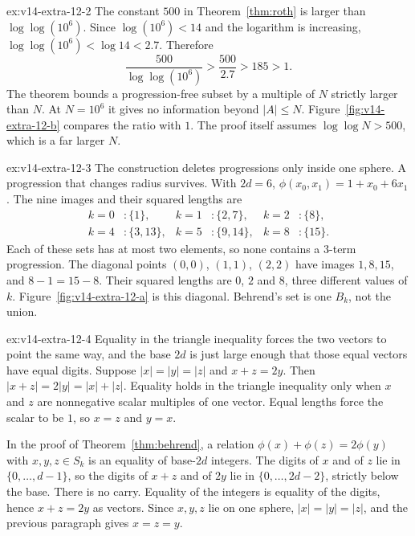 \begin{solution}{ex:v14-extra-12-2}
\idea The constant $500$ in Theorem~\ref{thm:roth} is larger than $\log\log(10^6)$.
\writeup Since $\log(10^6)<14$ and the logarithm is increasing, $\log\log(10^6)<\log14<2.7$. Therefore
\[
\frac{500}{\log\log(10^6)}>\frac{500}{2.7}>185>1.
\]
The theorem bounds a progression-free subset by a multiple of $N$ strictly larger than $N$. At $N=10^6$ it gives no information beyond $|A|\le N$. Figure~\ref{fig:v14-extra-12-b} compares the ratio with $1$. The proof itself assumes $\log\log N>500$, which is a far larger $N$.
\end{solution}

\begin{solution}{ex:v14-extra-12-3}
\idea The construction deletes progressions only inside one sphere. A progression that changes radius survives.
\writeup With $2d=6$, $\phi(x_0,x_1)=1+x_0+6x_1$. The nine images and their squared lengths are
\[
\begin{aligned}
k=0&: \{1\},& k=1&: \{2,7\},& k=2&: \{8\},\\
k=4&: \{3,13\},& k=5&: \{9,14\},& k=8&: \{15\}.
\end{aligned}
\]
Each of these sets has at most two elements, so none contains a $3$-term progression. The diagonal points $(0,0)$, $(1,1)$, $(2,2)$ have images $1,8,15$, and $8-1=15-8$. Their squared lengths are $0$, $2$ and $8$, three different values of $k$. Figure~\ref{fig:v14-extra-12-a} is this diagonal. Behrend's set is one $B_k$, not the union.
\end{solution}

\begin{solution}{ex:v14-extra-12-4}
\idea Equality in the triangle inequality forces the two vectors to point the same way, and the base $2d$ is just large enough that those equal vectors have equal digits.
\writeup Suppose $|x|=|y|=|z|$ and $x+z=2y$. Then $|x+z|=2|y|=|x|+|z|$. Equality holds in the triangle inequality only when $x$ and $z$ are nonnegative scalar multiples of one vector. Equal lengths force the scalar to be $1$, so $x=z$ and $y=x$.

In the proof of Theorem~\ref{thm:behrend}, a relation $\phi(x)+\phi(z)=2\phi(y)$ with $x,y,z\in S_k$ is an equality of base-$2d$ integers. The digits of $x$ and of $z$ lie in $\{0,\dots,d-1\}$, so the digits of $x+z$ and of $2y$ lie in $\{0,\dots,2d-2\}$, strictly below the base. There is no carry. Equality of the integers is equality of the digits, hence $x+z=2y$ as vectors. Since $x,y,z$ lie on one sphere, $|x|=|y|=|z|$, and the previous paragraph gives $x=z=y$.
\end{solution}

